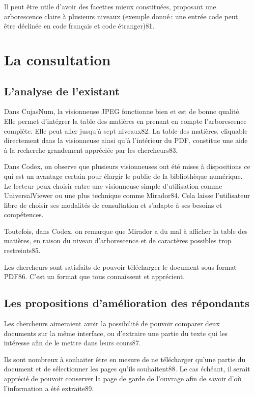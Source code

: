 Il peut être utile d’avoir des facettes mieux constituées, proposant une arborescence claire à plusieurs niveaux (exemple donné : une entrée code peut être déclinée en code français et code étranger)81.  



\section{La consultation} 

\subsection{L’analyse de l’existant}

Dans CujasNum, la visionneuse JPEG fonctionne bien et est de bonne qualité. Elle permet d’intégrer la table des matières en prenant en compte l’arborescence complète. Elle peut aller jusqu’à sept niveaux82. La table des matières, cliquable directement dans la visionneuse ainsi qu’à l’intérieur du PDF, constitue une aide à la recherche grandement appréciée par les chercheurs83. 

Dans Codex, on observe que plusieurs visionneuses ont été mises à dispositions ce qui est un avantage certain pour élargir le public de la bibliothèque numérique. Le lecteur peux choisir entre une visionneuse simple d’utilisation comme UniversalViewer ou une plus technique comme Mirador84. Cela laisse l’utilisateur libre de choisir ses modalités de consultation et s’adapte à ses besoins et compétences.  

Toutefois, dans Codex, on remarque que Mirador a du mal à afficher la table des matières, en raison du niveau d’arborescence et de caractères possibles trop restreints85. 

Les chercheurs sont satisfaits de pouvoir télécharger le document sous format PDF86. C’est un format que tous connaissent et apprécient. 

\subsection{Les propositions d’amélioration des répondants}

Les chercheurs aimeraient avoir la possibilité de pouvoir comparer deux documents sur la même interface, ou d’extraire une partie du texte qui les intéresse afin de le mettre dans leurs cours87.  

Ils sont nombreux à souhaiter être en mesure de ne télécharger qu’une partie du document et de sélectionner les pages qu’ils souhaitent88. Le cas échéant, il serait apprécié de pouvoir conserver la page de garde de l’ouvrage afin de savoir d’où l’information a été extraite89.  


